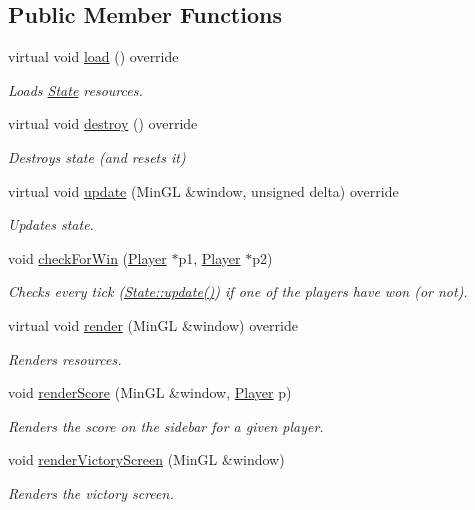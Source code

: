 \subsection*{Public Member Functions}
\begin{DoxyCompactItemize}
\item 
virtual void \hyperlink{classns_game_1_1_game_state_a66f7b8027a33f473fd22c212700586f2}{load} () override
\begin{DoxyCompactList}\small\item\em Loads \hyperlink{structns_game_1_1_state}{State} resources. \end{DoxyCompactList}\item 
virtual void \hyperlink{classns_game_1_1_game_state_ac0fdc8e463ca2e79a0fb58e12e5b39c9}{destroy} () override
\begin{DoxyCompactList}\small\item\em Destroys state (and resets it) \end{DoxyCompactList}\item 
virtual void \hyperlink{classns_game_1_1_game_state_a4d3cb871a1aec541a37fe241664b738c}{update} (Min\+GL \&window, unsigned delta) override
\begin{DoxyCompactList}\small\item\em Updates state. \end{DoxyCompactList}\item 
void \hyperlink{classns_game_1_1_game_state_a78176e52c8f3c745bb88a4214f5aa29b}{check\+For\+Win} (\hyperlink{classns_game_1_1_player}{Player} $\ast$p1, \hyperlink{classns_game_1_1_player}{Player} $\ast$p2)
\begin{DoxyCompactList}\small\item\em Checks every tick (\hyperlink{structns_game_1_1_state_ae809e89ac9df4a43ab90d5d5932e2bc7}{State\+::update()}) if one of the players have won (or not). \end{DoxyCompactList}\item 
virtual void \hyperlink{classns_game_1_1_game_state_a1e3179b016431332ecff880e09e267d3}{render} (Min\+GL \&window) override
\begin{DoxyCompactList}\small\item\em Renders resources. \end{DoxyCompactList}\item 
void \hyperlink{classns_game_1_1_game_state_a8d9cadd7432dfd4b7ada08e37bf6b30d}{render\+Score} (Min\+GL \&window, \hyperlink{classns_game_1_1_player}{Player} p)
\begin{DoxyCompactList}\small\item\em Renders the score on the sidebar for a given player. \end{DoxyCompactList}\item 
void \hyperlink{classns_game_1_1_game_state_a66f328c56ed9887e02a93db856316d4c}{render\+Victory\+Screen} (Min\+GL \&window)
\begin{DoxyCompactList}\small\item\em Renders the victory screen. \end{DoxyCompactList}\end{DoxyCompactItemize}
